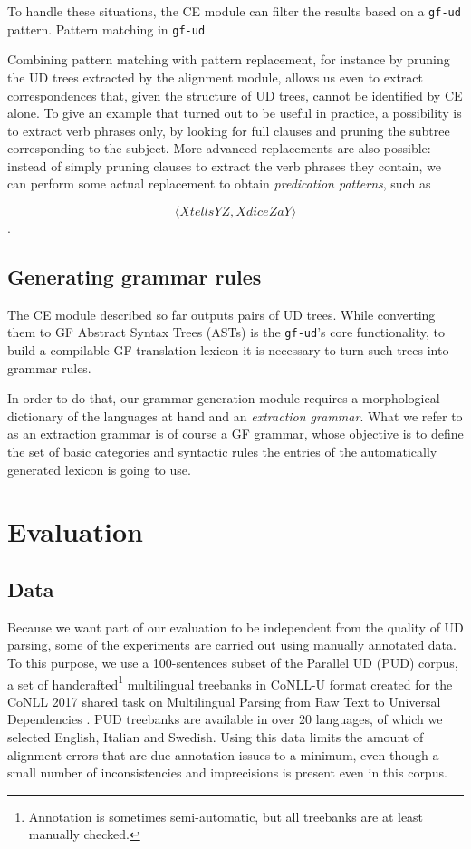 \documentclass[11pt]{article}
\begin{document}
To handle these situations, the CE module can filter the results based on a \texttt{gf-ud} pattern.
Pattern matching in \texttt{gf-ud} %

Combining pattern matching with pattern replacement, for instance by pruning the UD trees extracted by the alignment module, allows us even to extract correspondences that, given the structure of UD trees, cannot be identified by CE alone. 
To give an example that turned out to be useful in practice, a possibility is to extract verb phrases only, by looking for full clauses and pruning the subtree corresponding to the subject. 
More advanced replacements are also possible: instead of simply pruning clauses to extract the verb phrases they contain, we can perform some actual replacement to obtain \textit{predication patterns}, such as

$$\langle X tells Y Z, X dice Z a Y\rangle$$.


\subsection{Generating grammar rules}
The CE module described so far outputs pairs of UD trees. 
While converting them to GF Abstract Syntax Trees (ASTs) is the \texttt{gf-ud}'s core functionality, to build a compilable GF translation lexicon it is necessary to turn such trees into grammar rules.

In order to do that, our grammar generation module requires a morphological dictionary of the languages at hand and an \textit{extraction grammar}. 
What we refer to as an extraction grammar is of course a GF grammar, whose
objective is to define the set of basic categories and syntactic rules the entries of the automatically generated lexicon is going to use.


\section{Evaluation} \label{evaluation}
\subsection{Data}
Because we want part of our evaluation to be independent from the quality of UD parsing, some of the experiments are carried out using manually annotated data. 
To this purpose, we use a 100-sentences subset of the Parallel UD (PUD) corpus, a set of handcrafted\footnote{Annotation is sometimes semi-automatic, but all treebanks are at least manually checked.} multilingual treebanks in CoNLL-U format created for the CoNLL 2017 shared task on Multilingual Parsing from Raw Text to Universal Dependencies \cite{TODO:}.
PUD treebanks are available in over 20 languages, of which we selected English, Italian and Swedish. 
Using this data limits the amount of alignment errors that are due annotation issues to a minimum, even though a small number of inconsistencies and imprecisions is present even in this corpus.
\end{document}

